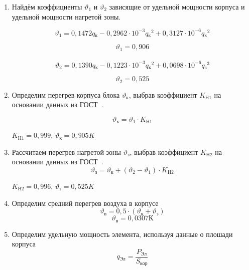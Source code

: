 \begin{enumerate}[label={\arabic*.}]
\item Найдём коэффициенты
$\vartheta_1$ и $\vartheta_2$ зависящие
от удельной мощности корпуса и удельной мощности нагретой зоны.

\begin{equation}
\vartheta_1 = 0,1472q\mathrm{_к} - 0,2962 \cdot 10^{-3}q\mathrm{_к}^2 + 0,3127 \cdot 10^{-6}q\mathrm{_к}^2
\end{equation}

$$\vartheta_1=0,906$$\\

\begin{equation}
\vartheta_2 = 0,1390q\mathrm{_к} - 0,1223 \cdot 10^{-3}q\mathrm{_к}^2 + 0,0698 \cdot 10^{-6}q\mathrm{_з}^3
\end{equation}

$$\vartheta_2 = 0,525$$


\item Определим перегрев корпуса блока $\vartheta\mathrm{_к}$,
  выбрав коэффициент $K\mathrm{_{Н1}}$ на основании данных из
  ГОСТ~\cite{GOST_15150-69}.

  \begin{equation}
    \vartheta\mathrm{_к} = \vartheta_1 \cdot K\mathrm{_{Н1}}
  \end{equation}

  $K\mathrm{_{Н1}} = 0,999$, $\vartheta\mathrm{_к} = 0,905 K$

\item Рассчитаем перегрев нагретой зоны $\vartheta\mathrm{_з}$,
  выбрав коэффициент $K\mathrm{_{Н2}}$ на основании данных из
  ГОСТ~\cite{GOST_15150-69}.
  \begin{equation}
    \vartheta\mathrm{_з} = \vartheta\mathrm{_к} + (\vartheta_2 - \vartheta_1) \cdot K\mathrm{_{H2}}
    \end{equation}

    $K\mathrm{_{Н2}} = 0,996$, $\vartheta\mathrm{_з} = 0,525 K$

  \item Определим средний перегрев воздуха в корпусе
    \begin{equation}
      \vartheta\mathrm{_в} = 0,5 \cdot (\vartheta\mathrm{_к} + \vartheta\mathrm{_з})
    \end{equation}
    $$\vartheta\mathrm{_в} = 0,0307 К$$

  \item Определим удельную мощность элемента, используя данные о плошади
корпуса
    \begin{equation}
      q\mathrm{_{Эл}} = \frac{P\mathrm{_{Эл}}}{S\mathrm{_{кор}}}
    \end{equation}


\end{enumerate}
